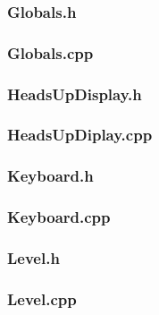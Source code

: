 \documentclass{article}
\begin{document}
\subsubsection{Globals.h}
	 
	 				
\subsubsection{Globals.cpp}
	  				
	 				
\subsubsection{HeadsUpDisplay.h}
	 
	 				
\subsubsection{HeadsUpDiplay.cpp}
	 		
	 				
\subsubsection{Keyboard.h}
	 
	 				
\subsubsection{Keyboard.cpp}
	 
	 				
\subsubsection{Level.h}
	 
	 				
\subsubsection{Level.cpp}
	 
	 				
\end{document}
